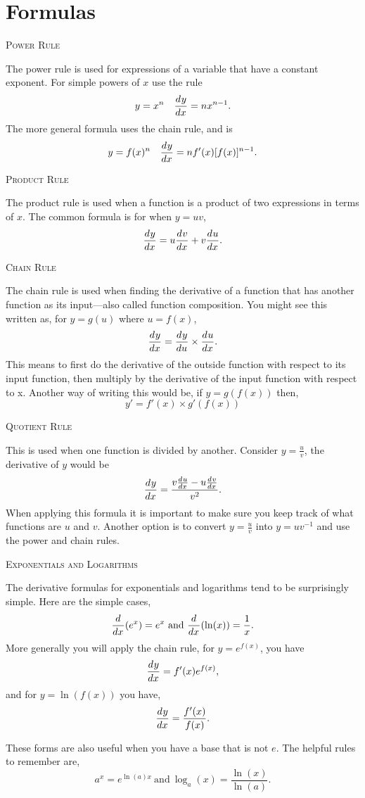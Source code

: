 \documentclass[a4paper,10pt]{article}
\newcommand{\deriv}[3][ ]{\ensuremath\frac{d^{#1}#2}{d#3^{#1}}}
\newcommand{\derivof}[2][ ]{\ensuremath\frac{d^{#1}}{d#2^{#1}}}
\begin{document}
\section*{Formulas}
\begin{multicols*}{2}
{\large\textsc{Power Rule}}

The power rule is used for expressions of a variable that have a constant 
exponent. For simple powers of $x$ use the rule 
$$y = x^n \quad \deriv{y}{x} = nx^{n-1}.$$
The more general formula uses the chain rule, and is
$$y = f(x)^n \quad \deriv{y}{x} = nf'(x)[f(x)]^{n-1}.$$

{\large\textsc{Product Rule}}

The product rule is used when a function is a product of two expressions 
in terms of $x$. The common formula is for when $y = uv$,
$$\deriv{y}{x} = u\deriv{v}{x} + v\deriv{u}{x}.$$

{\large\textsc{Chain Rule}}

The chain rule is used when finding the derivative of a function that 
has another function as its input---also called function composition.
You might see this written as, for $y = g(u)$ where $u = f(x)$, 
$$\deriv{y}{x} = \deriv{y}{u} \times \deriv{u}{x}.$$
This means to first do the derivative of the outside function with 
respect to its input function, then multiply by the derivative of the 
input function with respect to x. Another way of writing this would 
be, if $y = g(f(x))$ then,
$$y' = f'(x) \times g'(f(x))$$

{\large\textsc{Quotient Rule}}

This is used when one function is divided by another. Consider
$y = \frac{u}{v}$, the derivative of $y$ would be 
$$\deriv{y}{x} = \frac{v\deriv{u}{x} - u\deriv{v}{x}}{v^2}.$$
When applying this formula it is important to make sure you 
keep track of what functions are $u$ and $v$. Another option is to 
convert $y = \frac{u}{v}$ into $y = uv^{-1}$ and use the power 
and chain rules.

{\large\textsc{Exponentials and Logarithms}}

The derivative formulas for exponentials and logarithms tend to be 
surprisingly simple. Here are the simple cases, 
$$\derivof{x}(e^x) = e^x \textrm{~and~} \derivof{x}(\ln(x)) = \frac{1}{x}.$$
More generally you will apply the chain rule, for $y = e^{f(x)}$, you have 
$$\deriv{y}{x} = f'(x)e^{f(x)},$$
and for $y = \ln(f(x))$ you have,
$$\deriv{y}{x} = \frac{f'(x)}{f(x)}.$$

These forms are also useful when you have a base that is not $e$. 
The helpful rules to remember are,
$$a^x = e^{\ln(a)x} \mathrm{~and~} \log_a(x) = \frac{\ln(x)}{\ln(a)}.$$


\end{multicols*}
\end{document}
